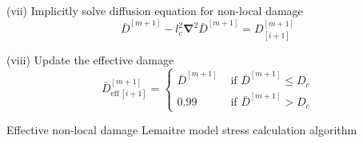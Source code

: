 \documentclass[sn-mathphys,Numbered]{sn-jnl}%
\newcommand{\bb}{\boldsymbol}
\begin{document}
\begin{algorithm}[htbp]
(vii) Implicitly solve diffusion equation for non-local damage
\begin{equation}
	\bar{D}^{[m+1]} -  l_c^2 \bb{\nabla}^2 \bar{D}^{[m+1]} = D^{[m+1]}_{[i+1]} \nonumber
\end{equation}
  
(viii) Update the effective damage
\begin{equation}
	\bar{D}^{[m+1]}_{\text{eff}\,[i+1]}  =
	\begin{cases}
		\bar{D}^{[m+1]} &
		\text { if }  \bar{D}^{[m+1]} \leq D_c \\
		0.99	& 
		\text { if }  \bar{D}^{[m+1]} > D_c
	\end{cases}  \nonumber
\end{equation}

\caption{Effective non-local damage Lemaitre model stress calculation algorithm}
\end{algorithm}
\normalsize


%
%
%
\end{document}
